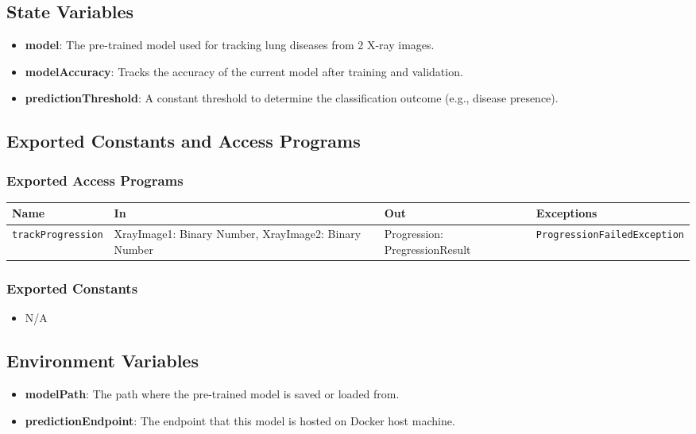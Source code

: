 \documentclass[12pt, titlepage]{article}
\begin{document}
\subsection{State Variables}
\begin{itemize}
    \item \textbf{model}: The pre-trained model used for tracking lung diseases from 2 X-ray images.
    \item \textbf{modelAccuracy}: Tracks the accuracy of the current model after training and validation.
    \item \textbf{predictionThreshold}: A constant threshold to determine the classification outcome (e.g., disease presence).
\end{itemize}

\subsection{Exported Constants and Access Programs}
\subsubsection{Exported Access Programs}
\begin{center}
\small
\renewcommand{\arraystretch}{1.5}
\begin{tabular}{|p{3.5cm}|p{3.5cm}|p{3cm}|l|}
    \hline
    \textbf{Name} & \textbf{In} & \textbf{Out} & \textbf{Exceptions} \\
    \hline 
    \texttt{trackProgression} & XrayImage1: Binary Number, \newline XrayImage2: Binary Number & Progression: PregressionResult & \texttt{ProgressionFailedException} \\
    \hline
\end{tabular}
\end{center}

\subsubsection{Exported Constants}
\begin{itemize}
    \item N/A
\end{itemize}

\subsection{Environment Variables}
\begin{itemize}
    \item \textbf{modelPath}: The path where the pre-trained model is saved or loaded from.
    \item \textbf{predictionEndpoint}: The endpoint that this model is hosted on Docker host machine.
\end{itemize}
\end{document}
